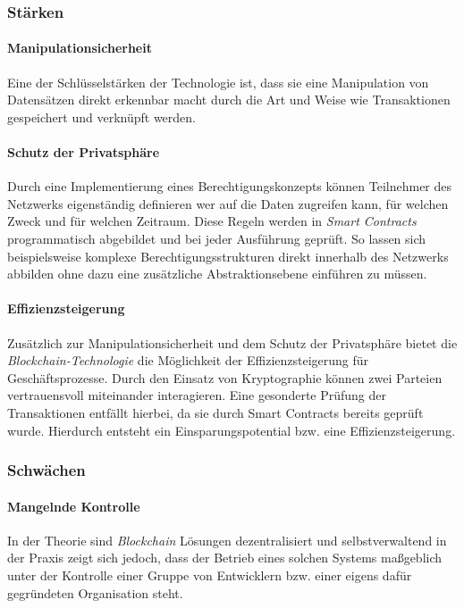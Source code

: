 \subsubsection{Stärken}
\paragraph{Manipulationsicherheit}
Eine der Schlüsselstärken der Technologie ist, dass sie eine Manipulation von Datensätzen direkt erkennbar macht durch die Art und Weise wie Transaktionen gespeichert und verknüpft werden.

\paragraph{Schutz der Privatsphäre}
Durch eine Implementierung eines Berechtigungskonzepts können Teilnehmer des Netzwerks eigenständig definieren wer auf die Daten zugreifen kann, für welchen Zweck und für welchen Zeitraum. Diese Regeln werden in \textit{Smart Contracts} programmatisch abgebildet und bei jeder Ausführung geprüft. So lassen sich beispielsweise komplexe Berechtigungsstrukturen direkt innerhalb des Netzwerks abbilden ohne dazu eine zusätzliche Abstraktionsebene einführen zu müssen. 

\paragraph{Effizienzsteigerung}
Zusätzlich zur Manipulationsicherheit und dem Schutz der Privatsphäre bietet die \textit{Blockchain-Technologie} die Möglichkeit der Effizienzsteigerung für Geschäftsprozesse. Durch den Einsatz von Kryptographie können zwei Parteien vertrauensvoll miteinander interagieren. Eine gesonderte Prüfung der Transaktionen entfällt hierbei, da sie durch Smart Contracts bereits geprüft wurde. Hierdurch entsteht ein Einsparungspotential bzw. eine Effizienzsteigerung.

\subsubsection{Schwächen}
\paragraph{Mangelnde Kontrolle}
In der Theorie sind \textit{Blockchain} Lösungen dezentralisiert und selbstverwaltend \citep[siehe auch][]{Nakamoto2009} in der Praxis zeigt sich jedoch, dass der Betrieb eines solchen Systems maßgeblich unter der Kontrolle einer Gruppe von Entwicklern bzw. einer eigens dafür gegründeten Organisation steht.


